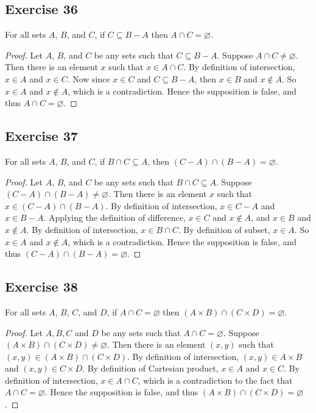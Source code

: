 \documentclass[14pt]{extarticle}
\newcommand{\es}{\varnothing}
\begin{document}
\subsection{Exercise 36}
For all sets $A$, $B$, and $C$, if \(C \subseteq B - A\) then \(A \cap C = \es\).

\begin{proof}
Let $A$, $B$, and $C$ be any sets such that \(C \subseteq B - A\). Suppose \(A \cap C \neq \es\). Then there is an 
element $x$ such that \(x \in A \cap C\). By definition of intersection, \(x \in A\) and \(x \in C\). Now since \(x 
\in C\) and \(C \subseteq B - A\), then \(x \in B\) and \(x \notin A\). So \(x \in A\) and \(x \notin A\), which is a 
contradiction. Hence the supposition is false, and thus \(A \cap C = \es\).
\end{proof}

\subsection{Exercise 37}
For all sets $A$, $B$, and $C$, if \(B \cap C \subseteq A\), then \((C - A) \cap (B - A) = \es\).

\begin{proof}
Let $A$, $B$, and $C$ be any sets such that \(B \cap C \subseteq A\). Suppose \((C-A) \cap (B-A) \neq \es\). Then 
there is an element $x$ such that \(x \in (C-A) \cap (B-A)\). By definition of intersection, \(x \in C-A\) and \(x 
\in B-A\). Applying the definition of difference, \(x \in C\) and \(x \notin A\), and \(x \in B\) and \(x \notin A\). 
By definition of intersection, \(x \in B \cap C\). By definition of subset, \(x \in A\). So \(x \in A\) and \(x 
\notin A\), which is a contradiction. Hence the supposition is false, and thus \((C-A) \cap (B-A) = \es\).
\end{proof}

\subsection{Exercise 38}
For all sets $A$, $B$, $C$, and $D$, if \(A \cap C = \es\) then \((A \times B) \cap (C \times D) = \es\).

\begin{proof}
Let $A, B, C$ and $D$ be any sets such that \(A \cap C = \es\). Suppose \((A \times B) \cap (C \times D) \neq \es\). 
Then there is an element $(x, y)$ such that \((x,y) \in (A \times B) \cap (C \times D)\). By definition of 
intersection, \((x,y) \in A \times B\) and \((x,y) \in C \times D\). By definition of Cartesian product, \(x \in A\) 
and \(x \in C\). By definition of intersection, \(x \in A \cap C\), which is a contradiction to the fact that \(A 
\cap C = \es\). Hence the supposition is false, and thus \((A \times B) \cap (C \times D) = \es\).
\end{proof}
\end{document}

